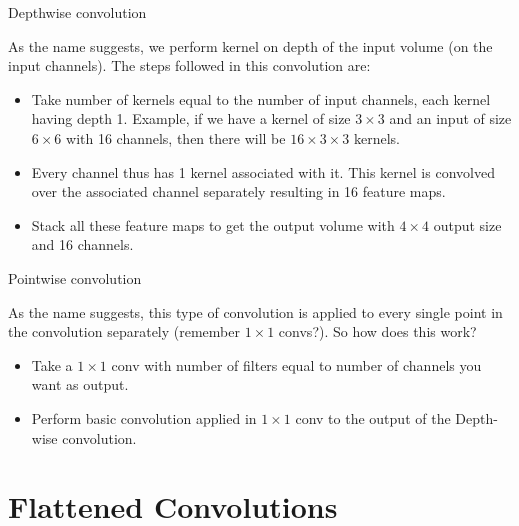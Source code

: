 \begin{vbframe}{Depthwise convolution }
 
 As the name suggests, we perform kernel on depth of the input volume (on the input channels). The steps followed in this convolution are:

   \begin{itemize}
     \item Take number of kernels equal to the number of input channels, each kernel having depth 1. Example, if we have a kernel of size $3\times 3$ and an input of size $6\times 6$ with 16 channels, then there will be $16 \times 3 \times 3$ kernels.
     \item Every channel thus has 1 kernel associated with it. This kernel is convolved over the associated channel separately resulting in 16 feature maps.
     \item Stack all these feature maps to get the output volume with $4 \times 4$ output size and 16 channels.
   \end{itemize}

     
\end{vbframe}

\begin{vbframe}{Pointwise convolution }
 
As the name suggests, this type of convolution is applied to every single point in the convolution separately (remember $1\times 1$ convs?). So how does this work?

   \begin{itemize}
     \item Take a $1\times 1$ conv with number of filters equal to number of channels you want as output.
     \item Perform basic convolution applied in $1\times 1$ conv to the output of the Depth-wise convolution.
   \end{itemize}

     
\end{vbframe}

\section{Flattened Convolutions}

